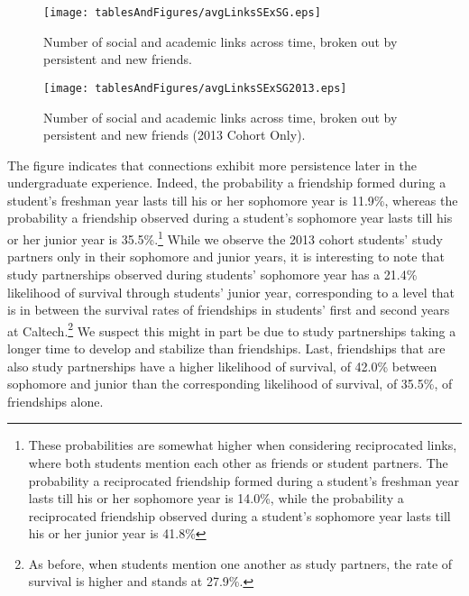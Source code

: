 \documentclass[12pt,letterpaper,english]{article}
\begin{document}

\begin{figure}[t!]
\begin{center}
\caption{Number of social and academic links across time, broken out by persistent and new friends. \label{numberLinks}}
\texttt{[image: tablesAndFigures/avgLinksSExSG.eps]}
\end{center}
\end{figure}

\begin{figure}[t!]
\begin{center}
\caption{Number of social and academic links across time, broken out by persistent and new friends (2013 Cohort Only). \label{numberLinks}}
\texttt{[image: tablesAndFigures/avgLinksSExSG2013.eps]}
\end{center}
\end{figure}



%

The figure indicates that connections exhibit more persistence later in the undergraduate experience. Indeed, the probability a friendship formed during a student's freshman year lasts till his or her sophomore year is 11.9\%, whereas the probability a friendship observed during a student's sophomore year lasts till his or her junior year is 35.5\%.\footnote{These probabilities are somewhat higher when considering reciprocated links, where both students mention each other as friends or student partners. The probability a reciprocated friendship formed during a student's freshman year lasts till his or her sophomore year is 14.0\%, while the probability a reciprocated friendship observed during a student's sophomore year lasts till his or her junior year is 41.8\%} While we observe the 2013 cohort students' study partners only in their sophomore and junior years, it is interesting to note that study partnerships observed during students' sophomore year has a 21.4\% likelihood of survival through students' junior year, corresponding to a level that is in between the survival rates of friendships in students' first and second years at Caltech.\footnote{As before, when students mention one another as study partners, the rate of survival is higher and stands at 27.9\%.} We suspect this might in part be due to study partnerships taking a longer time to develop and stabilize than friendships. Last, friendships that are also study partnerships have a higher likelihood of survival, of 42.0\% between sophomore and junior than the corresponding likelihood of survival, of 35.5\%, of friendships alone.
\end{document}

